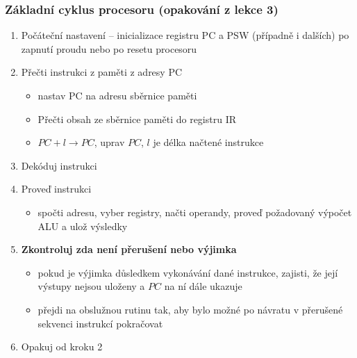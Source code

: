 \documentclass{beamer}
\begin{document}
\begin{frame}
\frametitle{Základní cyklus procesoru (opakování z lekce 3)}
\begin{enumerate}
  \item Počáteční nastavení -- inicializace registru PC a PSW (případně i dalších) po zapnutí proudu nebo po resetu procesoru
  \item Přečti instrukci z paměti z adresy PC
  \begin{itemize}
    \item nastav PC na adresu sběrnice paměti
    \item Přečti obsah ze sběrnice paměti do registru IR
    \item $PC+l \to PC$, uprav $PC$, $l$ je délka načtené instrukce
  \end{itemize}
  \item Dekóduj instrukci
  \item Proveď instrukci
  \begin{itemize}
    \item spočti adresu, vyber registry, načti operandy, proveď požadovaný výpočet ALU a ulož výsledky
  \end{itemize}
  \item \textbf{Zkontroluj zda není přerušení nebo výjimka}
  \begin{itemize}
    \item pokud je výjimka důsledkem vykonávání dané instrukce, zajisti, že její výstupy nejsou uloženy a $PC$ na ní dále ukazuje
    \item přejdi na obslužnou rutinu tak, aby bylo možné po návratu v přerušené sekvenci instrukcí pokračovat
  \end{itemize}
  \item Opakuj od kroku 2
\end{enumerate}
\end{frame}
\end{document}
